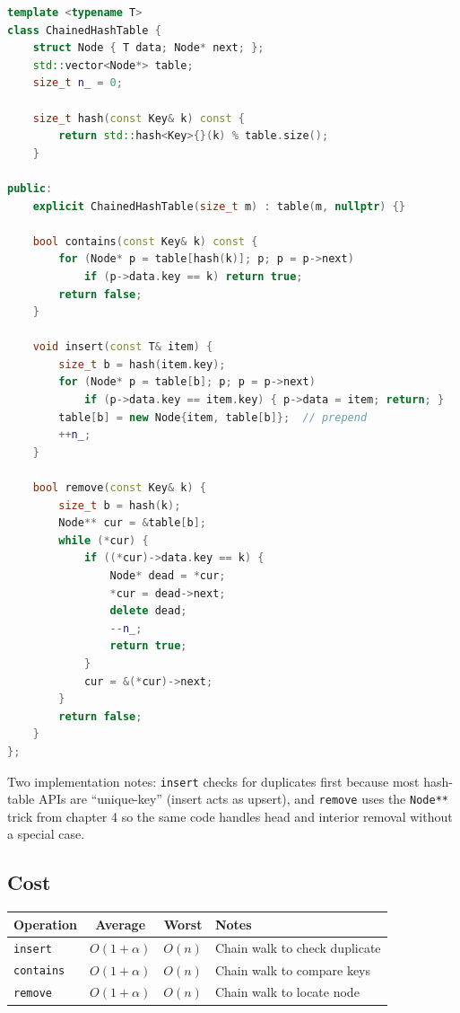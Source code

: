 \documentclass[11pt]{article}
\begin{document}
\begin{examplebox}
\begin{lstlisting}[language=C++,basicstyle=\ttfamily\small,frame=single]
template <typename T>
class ChainedHashTable {
    struct Node { T data; Node* next; };
    std::vector<Node*> table;
    size_t n_ = 0;

    size_t hash(const Key& k) const {
        return std::hash<Key>{}(k) % table.size();
    }

public:
    explicit ChainedHashTable(size_t m) : table(m, nullptr) {}

    bool contains(const Key& k) const {
        for (Node* p = table[hash(k)]; p; p = p->next)
            if (p->data.key == k) return true;
        return false;
    }

    void insert(const T& item) {
        size_t b = hash(item.key);
        for (Node* p = table[b]; p; p = p->next)
            if (p->data.key == item.key) { p->data = item; return; }
        table[b] = new Node{item, table[b]};  // prepend
        ++n_;
    }

    bool remove(const Key& k) {
        size_t b = hash(k);
        Node** cur = &table[b];
        while (*cur) {
            if ((*cur)->data.key == k) {
                Node* dead = *cur;
                *cur = dead->next;
                delete dead;
                --n_;
                return true;
            }
            cur = &(*cur)->next;
        }
        return false;
    }
};
\end{lstlisting}
\end{examplebox}

Two implementation notes: \texttt{insert} checks for duplicates
first because most hash-table APIs are ``unique-key'' (insert acts
as upsert), and \texttt{remove} uses the \texttt{Node**} trick
from chapter 4 so the same code handles head and interior removal
without a special case.

\subsection*{Cost}

\begin{center}
\begin{tabular}{|l|c|c|l|}
\hline
\textbf{Operation} & \textbf{Average} & \textbf{Worst} & \textbf{Notes} \\
\hline
\texttt{insert}   & $O(1 + \alpha)$ & $O(n)$ & Chain walk to check duplicate \\
\texttt{contains} & $O(1 + \alpha)$ & $O(n)$ & Chain walk to compare keys \\
\texttt{remove}   & $O(1 + \alpha)$ & $O(n)$ & Chain walk to locate node \\
\hline
\end{tabular}
\end{center}
\end{document}

